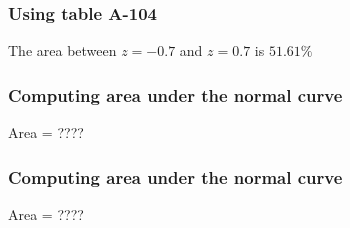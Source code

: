 \documentclass[handout]{beamer}
\begin{document}
   \begin{frame}
   \frametitle{Using table A-104}
   \begin{center}
   \end{center}
   The area between $z=-0.7$ and $z=0.7$ is $51.61\%$
   \end{frame}



   \begin{frame}
   \frametitle{Computing area under the normal curve}
   \begin{center}
   \end{center}
   Area = ????
   \end{frame}



   \begin{frame}
   \frametitle{Computing area under the normal curve}
   \begin{center}
   \end{center}
   Area = ????
   \end{frame}
\end{document}
